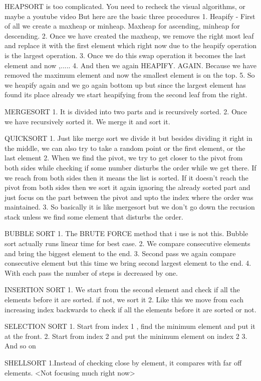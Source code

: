 HEAPSORT is too complicated. You need to recheck the visual algorithms, or maybe a youtube video
But here are the basic three procedures
1. Heapify - First of all we create a maxheap or minheap. Maxheap for ascending, minheap for descending.
2. Once we have created the maxheap, we remove the right most leaf and replace it with the first element which right now due to the heapify operation
is the largest operation.
3. Once we do this swap operation it becomes the last element and now ,.....
4. And then we again HEAPIFY. AGAIN. Because we have removed the maximum element and now the smallest element is on the top.
5. So we heapify again and we go again bottom up but since the largest element has found its place already we start heapifying from the second leaf from the right.


MERGESORT
1. It is divided into two parts and is recursively sorted. 
2. Once we have recursively sorted it. We merge it and sort it.


QUICKSORT
1. Just like merge sort we divide it but besides dividing it right in the middle, we can also try to take a random point or the first element, or the last element
2. When we find the pivot, we try to get closer to the pivot from both sides while checking if some number disturbs the order while we get there. If we reach
from both sides then it means the list is sorted. If it doesn't reach the pivot from both sides then we sort it again ignoring the already sorted part
and just focus on the part between the pivot and upto the index where the order was maintained.
3. So basically it is like mergesort but we don't go down the recusion stack unless we find some element that disturbs the order.


BUBBLE SORT
1. The BRUTE FORCE method that i use is not this. Bubble sort actually runs linear time for best case. 
2. We compare consecutive elements and bring the biggest element to the end.
3. Second pass we again compare consecutive element but this time we bring second largest element to the end.
4. With each pass the number of steps is decreased by one.


INSERTION SORT
1. We start from the second element and check if all the elements before it are sorted. if not, we sort it
2. Like this we move from each increasing index backwards to check if all the elements before it are sorted or not.


SELECTION SORT
1. Start from index 1 , find the minimum element and put it at the front.
2. Start from index 2 and put the minimum element on index 2
3. And so on


SHELLSORT
1.Instead of checking close by element, it compares with far off elements. 		<Not focusing much right now>

